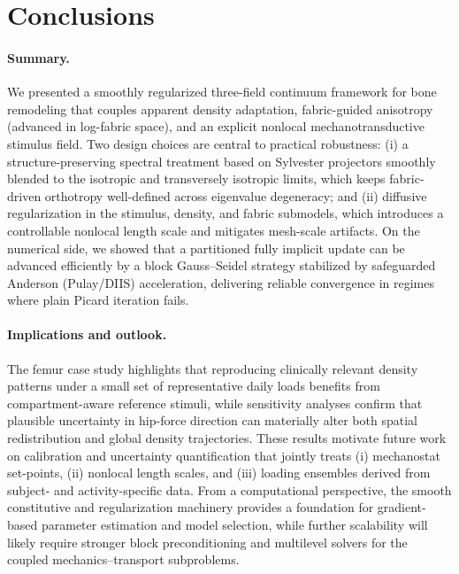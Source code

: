 \section*{Conclusions}
\label{sec:conclusions}

\paragraph{Summary.}
We presented a smoothly regularized three-field continuum framework for bone remodeling that couples apparent density adaptation, fabric-guided anisotropy (advanced in log-fabric space), and an explicit nonlocal mechanotransductive stimulus field.
Two design choices are central to practical robustness: (i) a structure-preserving spectral treatment based on Sylvester projectors smoothly blended to the isotropic and transversely isotropic limits, which keeps fabric-driven orthotropy well-defined across eigenvalue degeneracy; and (ii) diffusive regularization in the stimulus, density, and fabric submodels, which introduces a controllable nonlocal length scale and mitigates mesh-scale artifacts.
On the numerical side, we showed that a partitioned fully implicit update can be advanced efficiently by a block Gauss--Seidel strategy stabilized by safeguarded Anderson (Pulay/DIIS) acceleration, delivering reliable convergence in regimes where plain Picard iteration fails.

\paragraph{Implications and outlook.}
The femur case study highlights that reproducing clinically relevant density patterns under a small set of representative daily loads benefits from compartment-aware reference stimuli, while sensitivity analyses confirm that plausible uncertainty in hip-force direction can materially alter both spatial redistribution and global density trajectories.
These results motivate future work on calibration and uncertainty quantification that jointly treats (i) mechanostat set-points, (ii) nonlocal length scales, and (iii) loading ensembles derived from subject- and activity-specific data.
From a computational perspective, the smooth constitutive and regularization machinery provides a foundation for gradient-based parameter estimation and model selection, while further scalability will likely require stronger block preconditioning and multilevel solvers for the coupled mechanics--transport subproblems.
